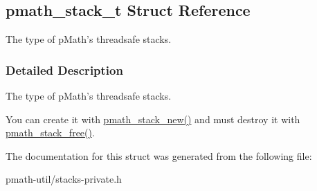 \hypertarget{struct__pmath__stack__t}{
\subsection{pmath\_\-stack\_\-t Struct Reference}
\label{struct__pmath__stack__t}
}
The type of pMath's threadsafe stacks.  




\subsubsection{Detailed Description}
The type of pMath's threadsafe stacks. 

You can create it with \hyperlink{group__stacks_g4a549111f394261de5ac3cc3acda428b}{pmath\_\-stack\_\-new()} and must destroy it with \hyperlink{group__stacks_gc681555957545245455f2a0ac97e3828}{pmath\_\-stack\_\-free()}. 

The documentation for this struct was generated from the following file:\begin{CompactItemize}
\item 
pmath-util/stacks-private.h\end{CompactItemize}
